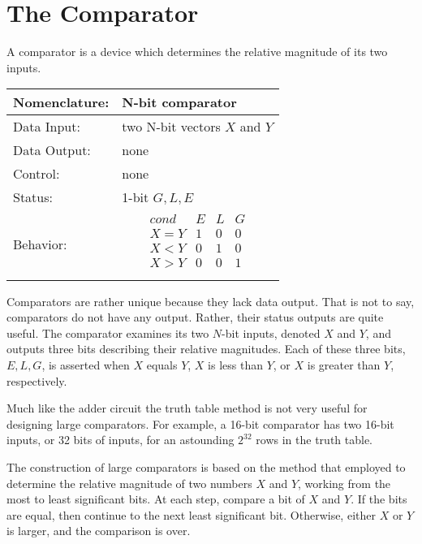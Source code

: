 \section{The Comparator}
A comparator is a device which determines the relative magnitude
of its two inputs.

\begin{tabular}{|l|p{3.5in}|} \hline
Nomenclature:  & N-bit comparator                \\ \hline
Data Input:    & two N-bit vectors $X$ and $Y$           \\ \hline  
Data Output:   & none               \\ \hline
Control:       & none                      \\ \hline
Status:        & 1-bit $G,L,E$ \\ \hline
Behavior:      & 
		$$\begin{array}{l|l|l|l}
      			cond  & E & L & G \\ \hline
			X = Y & 1 & 0 & 0 \\ \hline
			X < Y & 0 & 1 & 0 \\ \hline
			X > Y & 0 & 0 & 1 \\
		\end{array}$$			\\ \hline
\end{tabular}
\label{page:com}

Comparators are rather unique because they lack data output.  That is
not to say, comparators do not have any output. Rather, their status outputs are quite
useful.  The comparator examines its two $N$-bit inputs, denoted $X$ and
$Y$, and outputs three bits describing their relative magnitudes.  
Each of these three bits, $E,L,G$, is asserted when $X$ equals $Y$, 
$X$ is less than $Y$, or $X$ is greater than $Y$, respectively.  

Much like the adder circuit the truth table method is not very 
useful for designing large comparators.  For example, a 16-bit 
comparator has two 16-bit inputs, or 32 bits of inputs, for an 
astounding $2^{32}$ rows in the truth table.  

The construction of large comparators is based on the method that 
employed to determine the relative magnitude of two numbers $X$
and $Y$, working from the most to least significant
bits.  At each step, compare a bit of $X$ and $Y$.  If the bits
are equal, then continue to the next least significant bit.  Otherwise,
either $X$ or $Y$ is larger, and the comparison is over.

